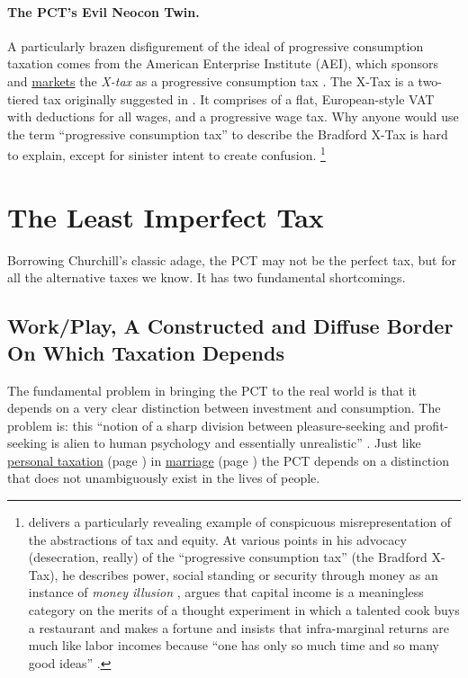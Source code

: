 \paragraph{The PCT's Evil Neocon Twin.}
A particularly brazen disfigurement of the ideal of progressive consumption taxation comes from the American Enterprise Institute (AEI), which sponsors and \href{http://www.aei.org/outlook/29082}{markets} the \emph{\citeauthor{Bradford} X-tax} as a progressive consumption tax \citep{Bradford}.
The \citeauthor{Bradford1986} X-Tax is a two-tiered tax originally suggested in \citeyear{Bradford1986}.
It comprises of a flat, European-style VAT with deductions for all wages, and a progressive wage tax.
Why anyone would use the term ``progressive consumption tax'' to describe the Bradford X-Tax is hard to explain, except for sinister intent to create confusion.
\footnote{
	\cite{Shaviro2004} delivers a particularly revealing example of conspicuous misrepresentation of the abstractions of tax and equity.
	At various points in his advocacy (desecration, really) of the ``progressive consumption tax'' (the Bradford X-Tax), he describes power, social standing or security through money as an instance of \emph{money illusion} \citeyearpar[106]{Shaviro2004}, argues that capital income is a meaningless category on the merits of a thought experiment in which a talented cook buys a restaurant and makes a fortune \citeyearpar[100]{Shaviro2004} and insists that infra-marginal returns are much like labor incomes because ``one has only so much time and so many good ideas'' \citeyearpar[103]{Shaviro2004}.}

\section{The Least Imperfect Tax}
	\label{sec:LeastImperfect}
Borrowing Churchill's classic adage, the PCT may not be the perfect tax, but for all the alternative taxes we know.
It has two fundamental shortcomings.

\subsection[Work/Play]{Work/Play, A Constructed and Diffuse Border On Which Taxation Depends}
	\label{sec:work-play}
The fundamental problem in bringing the PCT to the real world is that it depends on a very clear distinction between investment and consumption.
The problem is:
this ``notion of a sharp division between pleasure-seeking and profit-seeking is alien to human psychology and essentially unrealistic'' \citep[203]{Bittker1973}.
Just like \hyperref[des:personal-taxation]{personal taxation} (page \pageref{des:personal-taxation}) in \hyperref[sec:love-marriage]{marriage} (page \pageref{sec:love-marriage}) the PCT depends on a distinction that does not unambiguously exist in the lives of people.

